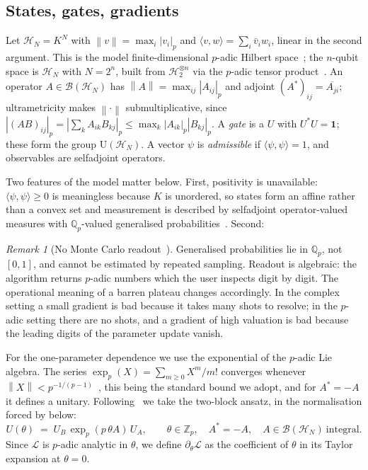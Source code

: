 \documentclass{ceurart}
\theoremstyle{plain}
\theoremstyle{definition}
\theoremstyle{remark}
\newtheorem{remark}[theorem]{Remark}
\theoremstyle{plain}
\newcommand{\Qp}{\mathbb{Q}_p}
\newcommand{\Zp}{\mathbb{Z}_p}
\newcommand{\padicnorm}[1]{\left|#1\right|_p}
\newcommand{\opnorm}[1]{\left\|#1\right\|}
\newcommand{\inner}[2]{\langle #1, #2\rangle}
\newcommand{\HH}{\mathcal{H}}
\newcommand{\BB}{\mathcal{B}}
\newcommand{\Id}{\mathbf{1}}
\newcommand{\loss}{\mathcal{L}}
\newcommand{\Uni}{\mathrm{U}}
\begin{document}
\subsection{States, gates, gradients}

Let $\HH_N=K^{N}$ with $\opnorm{v}=\max_i\padicnorm{v_i}$ and
$\inner vw=\sum_i\bar v_i w_i$, linear in the second argument. This is the
model finite-dimensional $p$-adic Hilbert space~\cite{AMP23}; the $n$-qubit
space is $\HH_N$ with $N=2^n$, built from $\HH_2^{\otimes n}$ via the $p$-adic
tensor product~\cite{Mu25tensor}. An operator $A\in\BB(\HH_N)$ has
$\opnorm A=\max_{ij}\padicnorm{A_{ij}}$ and adjoint
$(A^\ast)_{ij}=\overline{A_{ji}}$; ultrametricity makes $\opnorm{\cdot}$
submultiplicative, since
$\padicnorm{(AB)_{ij}}=\padicnorm{\sum_kA_{ik}B_{kj}}
\le\max_k\padicnorm{A_{ik}}\padicnorm{B_{kj}}$. A \emph{gate} is a $U$ with
$U^\ast U=\Id$; these form the group $\Uni(\HH_N)$. A vector $\psi$ is
\emph{admissible} if $\inner\psi\psi=1$, and observables are selfadjoint
operators.

Two features of the model matter below. First, positivity is unavailable:
$\inner\psi\psi\ge0$ is meaningless because $K$ is unordered, so states form an
affine rather than a convex set and measurement is described by selfadjoint
operator-valued measures with $\Qp$-valued generalised
probabilities~\cite{AMP23,Kh97}. Second:

\begin{remark}[No Monte Carlo readout~\cite{AMP23}]
\label{rem:nosampling}
Generalised probabilities lie in $\Qp$, not $[0,1]$, and cannot be estimated by
repeated sampling. Readout is algebraic: the algorithm returns $p$-adic numbers
which the user inspects digit by digit. The operational meaning of a barren
plateau changes accordingly. In the complex setting a small gradient is bad
because it takes many shots to resolve; in the $p$-adic setting there are no
shots, and a gradient of high valuation is bad because the leading digits of
the parameter update vanish.
\end{remark}

For the one-parameter dependence we use the exponential of the $p$-adic Lie
algebra. The series $\exp_p(X)=\sum_{m\ge0}X^m/m!$ converges whenever
$\opnorm X<p^{-1/(p-1)}$~\cite{DDMS99}, this being the standard bound we adopt,
and for $A^\ast=-A$ it defines a unitary. Following~\cite{Mc18} we take the two-block ansatz, in the
normalisation forced by  below:
\begin{equation}
\label{eq:ansatz}
  U(\theta)\;=\;U_B\,\exp_p(p\,\theta A)\,U_A ,\qquad
  \theta\in\Zp,\quad A^\ast=-A,\quad A\in \BB(\HH_N)\ \text{integral} .
\end{equation}
Since $\loss$ is $p$-adic analytic in $\theta$, we define $\partial_\theta\loss$
as the coefficient of $\theta$ in its Taylor expansion at $\theta=0$.
\end{document}
